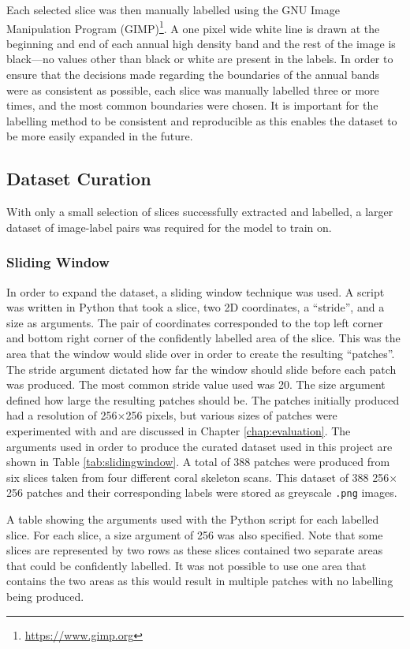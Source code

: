 Each selected slice was then manually labelled using the GNU Image Manipulation Program (GIMP)\footnote{\url{https://www.gimp.org}}. A one pixel wide white line is drawn at the beginning and end of each annual high density band and the rest of the image is black---no values other than black or white are present in the labels. In order to ensure that the decisions made regarding the boundaries of the annual bands were as consistent as possible, each slice was manually labelled three or more times, and the most common boundaries were chosen. It is important for the labelling method to be consistent and reproducible as this enables the dataset to be more easily expanded in the future.

\subsection{Dataset Curation}
\label{sec:datasetcuration}

With only a small selection of slices successfully extracted and labelled, a larger dataset of image-label pairs was required for the model to train on.

\subsubsection{Sliding Window}

In order to expand the dataset, a sliding window technique was used. A script was written in Python that took a slice, two 2D coordinates, a ``stride'', and a size as arguments. The pair of coordinates corresponded to the top left corner and bottom right corner of the confidently labelled area of the slice. This was the area that the window would slide over in order to create the resulting ``patches''. The stride argument dictated how far the window should slide before each patch was produced. The most common stride value used was 20. The size argument defined how large the resulting patches should be. The patches initially produced had a resolution of 256$\times$256 pixels, but various sizes of patches were experimented with and are discussed in Chapter \ref{chap:evaluation}. The arguments used in order to produce the curated dataset used in this project are shown in Table \ref{tab:slidingwindow}. A total of 388 patches were produced from six slices taken from four different coral skeleton scans. This dataset of 388 256$\times$256 patches and their corresponding labels were stored as greyscale \texttt{.png} images.

\begin{table}[t]
\centering
\caption{A table showing the arguments used with the Python script for each labelled slice. For each slice, a size argument of 256 was also specified. Note that some slices are represented by two rows as these slices contained two separate areas that could be confidently labelled. It was not possible to use one area that contains the two areas as this would result in multiple patches with no labelling being produced.}

\label{tab:slidingwindow}
\end{table}

